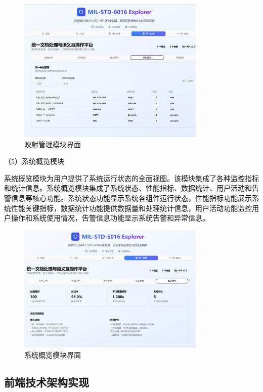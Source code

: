 \begin{figure}[H]
\centering
\includegraphics[width=0.8\textwidth]{chapters/fig-0/front_project.png}
\caption{映射管理模块界面}
\label{fig:frontend-mapping}
\end{figure}

（5）系统概览模块

系统概览模块为用户提供了系统运行状态的全面视图。该模块集成了各种监控指标和统计信息。系统概览模块集成了系统状态、性能指标、数据统计、用户活动和告警信息等核心功能。系统状态功能显示系统各组件运行状态，性能指标功能展示系统性能关键指标，数据统计功能提供数据量和处理统计信息，用户活动功能监控用户操作和系统使用情况，告警信息功能显示系统告警和异常信息。

\begin{figure}[H]
\centering
\includegraphics[width=0.8\textwidth]{chapters/fig-0/front_overview.png}
\caption{系统概览模块界面}
\label{fig:frontend-overview}
\end{figure}

\subsection{前端技术架构实现}

